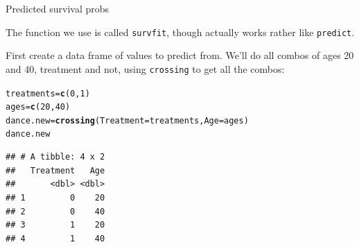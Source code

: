 \documentclass[unknownkeysallowed]{beamer}\usepackage[]{graphicx}\usepackage[]{color}
\makeatletter
\newcommand{\hlnum}[1]{\textcolor[rgb]{0.686,0.059,0.569}{#1}}%
\newcommand{\hlstd}[1]{\textcolor[rgb]{0.345,0.345,0.345}{#1}}%
\newcommand{\hlkwb}[1]{\textcolor[rgb]{0.69,0.353,0.396}{#1}}%
\newcommand{\hlkwc}[1]{\textcolor[rgb]{0.333,0.667,0.333}{#1}}%
\newcommand{\hlkwd}[1]{\textcolor[rgb]{0.737,0.353,0.396}{\textbf{#1}}}%
\newenvironment{kframe}{%
 \def\at@end@of@kframe{}%
 \ifinner\ifhmode%
  \def\at@end@of@kframe{\end{minipage}}%
  \begin{minipage}{\columnwidth}%
 \fi\fi%
 \def\FrameCommand##1{\hskip\@totalleftmargin \hskip-\fboxsep
 \colorbox{shadecolor}{##1}\hskip-\fboxsep
     \hskip-\linewidth \hskip-\@totalleftmargin \hskip\columnwidth}%
 \MakeFramed {\advance\hsize-\width
   \@totalleftmargin\z@ \linewidth\hsize
   \@setminipage}}%
 {\par\unskip\endMakeFramed%
 \at@end@of@kframe}
\newenvironment{knitrout}{}{} %
\makeatother
\begin{document}
\begin{frame}[fragile]{Predicted survival probs}

The function we use is called
\texttt{survfit}, though actually works rather like
\texttt{predict}. 

First create a data frame of values to predict from. We'll do all
combos of ages 20 and 40, treatment and not, using
\texttt{crossing} to get all the combos:

 
\begin{knitrout}\small
{}\color{fgcolor}\begin{kframe}
\begin{alltt}
\hlstd{treatments}\hlkwb{=}\hlkwd{c}\hlstd{(}\hlnum{0}\hlstd{,}\hlnum{1}\hlstd{)}
\hlstd{ages}\hlkwb{=}\hlkwd{c}\hlstd{(}\hlnum{20}\hlstd{,}\hlnum{40}\hlstd{)}
\hlstd{dance.new}\hlkwb{=}\hlkwd{crossing}\hlstd{(}\hlkwc{Treatment}\hlstd{=treatments,}\hlkwc{Age}\hlstd{=ages)}
\hlstd{dance.new}
\end{alltt}
\begin{verbatim}
## # A tibble: 4 x 2
##   Treatment   Age
##       <dbl> <dbl>
## 1         0    20
## 2         0    40
## 3         1    20
## 4         1    40
\end{verbatim}
\end{kframe}
\end{knitrout}




\end{frame}
\end{document}
